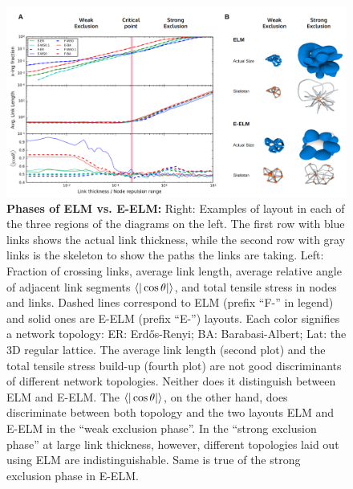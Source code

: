 \documentclass[nofootinbib,preprint,floatfix]{revtex4} %
\begin{document}
\begin{figure}
    \centering
    \includegraphics[width=1\columnwidth]{fig-09-19/phase-compare-5.png}
    \caption{{\bf Phases of ELM vs. E-ELM:} Right: Examples of layout in each of the three regions of the diagrams on the left. 
    The first row with blue links shows the actual link thickness, while the second row with gray links is the skeleton to show the paths the links are taking.
    Left: Fraction of crossing links, average link length, average relative angle of adjacent link segments $\be{|\cos\theta |}$, and total tensile stress in nodes and links. 
    Dashed lines correspond to ELM (prefix ``F-'' in legend) and solid ones are E-ELM (prefix ``E-'') layouts. 
    Each color signifies a network topology: ER: Erdős-Renyi; BA: Barabasi-Albert; Lat: the 3D regular lattice. %
    The average link length (second plot) and the total tensile stress build-up (fourth plot) are not good discriminants of different network topologies. 
    Neither does it distinguish between ELM and E-ELM. The $\be{|\cos\theta |}$, on the other hand, does discriminate between both topology and the two layouts ELM and E-ELM in the  ``weak exclusion phase''. In the ``strong exclusion phase'' at large link thickness, however, different topologies laid out using ELM are indistinguishable. Same is true of the strong exclusion phase in E-ELM. %
    }
    \label{fig:phase-compare}
\end{figure}
\end{document}
